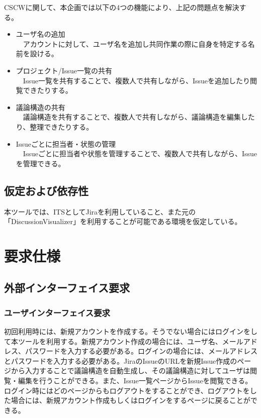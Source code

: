 \documentclass[12pt, oneside]{jreport}
\begin{document}
	CSCWに関して、本企画では以下の4つの機能により、上記の問題点を解決する。
	\begin{itemize}
		\item ユーザ名の追加
		\\
		　アカウントに対して、ユーザ名を追加し共同作業の際に自身を特定する名前を設ける。
		\item プロジェクト/Issue一覧の共有
		\\
		　Issue一覧を共有することで、複数人で共有しながら、Issueを追加したり閲覧できたりする。
		\item 議論構造の共有
		\\
		　議論構造を共有することで、複数人で共有しながら、議論構造を編集したり、整理できたりする。
		\item Issueごとに担当者・状態の管理
		\\
		　Issueごとに担当者や状態を管理することで、複数人で共有しながら、Issueを管理できる。
	\end{itemize}

	\section{仮定および依存性}
	本ツールでは、ITSとしてJiraを利用していること、また元の「DiscussionVisualizer」を利用することが可能である環境を仮定している。

\chapter{要求仕様}

	\section{外部インターフェイス要求}
		
		\subsection{ユーザインターフェイス要求}
		初回利用時には、新規アカウントを作成する。そうでない場合にはログインをして本ツールを利用する。新規アカウント作成の場合には、ユーザ名、メールアドレス、パスワードを入力する必要がある。ログインの場合には、メールアドレスとパスワードを入力する必要がある。JiraのIssueのURLを新規Issue作成のページから入力することで議論構造を自動生成し、その議論構造に対してユーザは閲覧・編集を行うことができる。また、Issue一覧ページからIssueを閲覧できる。ログイン時にはどのページからもログアウトをすることができ、ログアウトをした場合には、新規アカウント作成もしくはログインをするページに戻ることができる。
	
\end{document}
